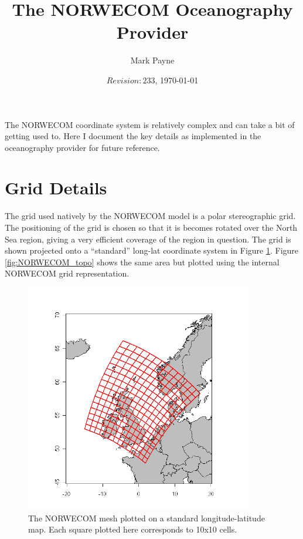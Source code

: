 \documentclass[a4paper,10pt]{article}
\title{The NORWECOM Oceanography Provider}
\author{Mark Payne}
\date{$Revision: 233$, \today}
\begin{document}
\maketitle

The NORWECOM coordinate system is relatively complex and can take a bit of getting used to. Here I document the key details as implemented in the oceanography provider for future reference.

\section{Grid Details}
The grid used natively by the NORWECOM model is a polar stereographic grid. The positioning of the grid is chosen so that it is becomes rotated over the North Sea region, giving a very efficient coverage of the region in question. The grid is shown projected onto a ``standard'' long-lat coordinate system in Figure \ref{fig:NORWECOM_grid}. Figure \ref{fig:NORWECOM_topo} shows the same area but plotted using the internal NORWECOM grid representation.
\begin{figure}[t]
 \centering
 \includegraphics[width=100mm]{figures/NORWECOM_mesh.png}
 \caption{\label{fig:NORWECOM_grid}The NORWECOM mesh plotted on a standard longitude-latitude map. Each square plotted here  corresponds to 10x10 cells.}
\end{figure}
\end{document}
